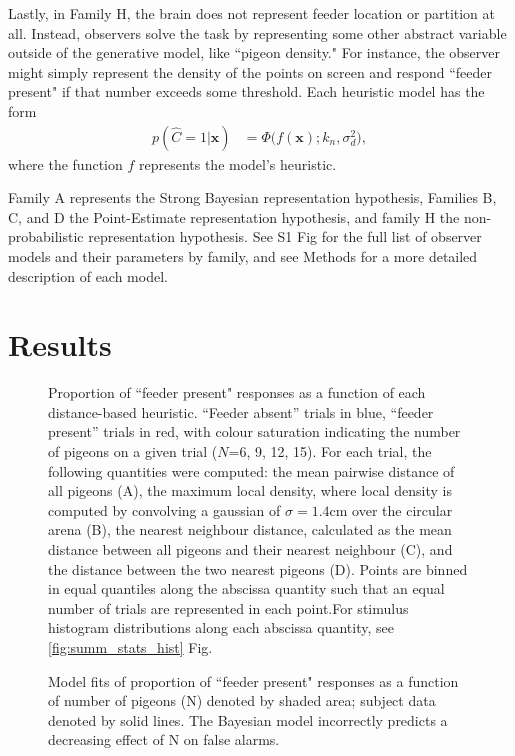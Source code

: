 \documentclass{article}
\begin{document}
Lastly, in Family H, the brain does not represent feeder location or partition at all. Instead, observers solve the task by representing some other abstract variable outside of the generative model, like ``pigeon density." For instance, the observer might simply represent the density of the points on screen and respond ``feeder present" if that number exceeds some threshold. Each heuristic model has the form
\begin{align*}
    p(\hat{C}=1|\mathbf{x}) &= \Phi\Big(f(\mathbf{x}); k_n,\sigma_d^2\Big),
\end{align*}
where the function $f$ represents the model's heuristic.

Family A represents the Strong Bayesian representation hypothesis, Families B, C, and D the Point-Estimate representation hypothesis, and family H the non-probabilistic representation hypothesis. See S1 Fig for the full list of observer models and their parameters by family, and see Methods for a more detailed description of each model.

\section*{Results}

\begin{figure}[ht]
\begin{center}
   \caption{Proportion of ``feeder present" responses as a function of each distance-based heuristic. ``Feeder absent'' trials in blue, ``feeder present'' trials in red, with colour saturation indicating the number of pigeons on a given trial ($N$=6, 9, 12, 15). For each trial, the following quantities were computed: the mean pairwise distance of all pigeons (A), the maximum local density, where local density is computed by convolving a gaussian of $\sigma=1.4$cm over the circular arena (B), the nearest neighbour distance, calculated as the mean distance between all pigeons and their nearest neighbour (C), and the distance between the two nearest pigeons (D). Points are binned in equal quantiles along the abscissa quantity such that an equal number of trials are represented in each point.For stimulus histogram distributions along each abscissa quantity, see \ref{fig:summ_stats_hist} Fig.}
   \label{fig:summ_stats}
\end{center}
\end{figure}

\begin{figure}[ht]
\begin{center}
   \caption{Model fits of proportion of ``feeder present" responses as a function of number of pigeons (N) denoted by shaded area; subject data denoted by solid lines. The Bayesian model incorrectly predicts a decreasing effect of N on false alarms.}
   \label{fig:N4}
\end{center}
\end{figure}
\end{document}
